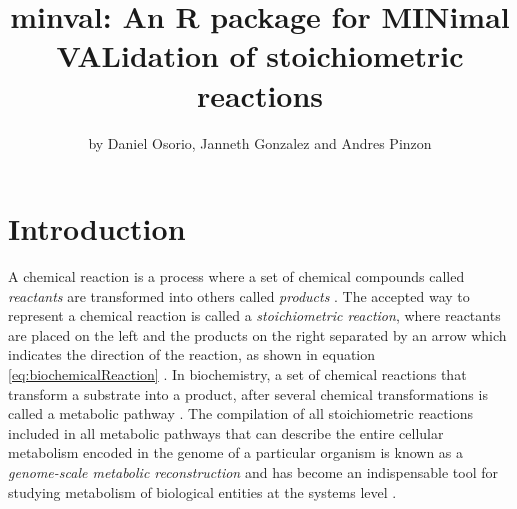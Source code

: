 \title{minval: An R package for MINimal VALidation of stoichiometric reactions}
\author{by Daniel Osorio, Janneth Gonzalez and Andres Pinzon}

\maketitle


\section{Introduction}
A chemical reaction is a process where a set of chemical compounds called \emph{reactants} are transformed into others called \emph{products} \citep{Chen2013}. The accepted way to represent a chemical reaction is called a \emph{stoichiometric reaction}, where reactants are placed on the left and the products on the right separated by an arrow which indicates the direction of the reaction, as shown in equation \ref{eq:biochemicalReaction} \citep{Hendrickson1997}. In biochemistry, a set of chemical reactions that transform a substrate into a product, after several chemical transformations is called a metabolic pathway \citep{Lambert2011}. The compilation of all stoichiometric reactions included in all metabolic pathways that can describe the entire cellular metabolism encoded in the genome of a particular organism is known as a \emph{genome-scale metabolic reconstruction} \citep{Park2009} and has become an indispensable tool for studying metabolism of biological entities at the systems level \citep{Thiele2010}.

